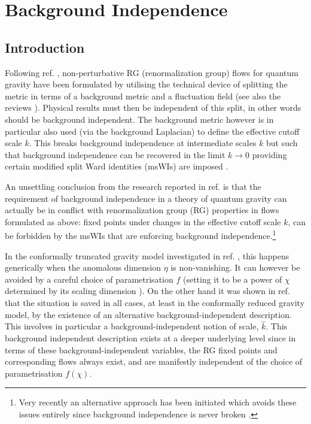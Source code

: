 \documentclass[11pt]{book} %
\begin{document}

\chapter{Background Independence}


\section{Introduction}
\label{sec:introduction}

Following ref. \cite{Reuter:1996cp},
non-perturbative RG (renormalization group) flows for quantum gravity have been formulated
by utilising the technical device of splitting the metric in terms of a background metric
and a fluctuation field (see also the reviews
\cite{Reuter:2012id, Percacci:2011fr, Niedermaier:2006wt, Nagy:2012ef, Litim:2011cp}).
Physical results must then be independent of this split, in other words should be background independent.
The background metric however is in particular also used (via the background Laplacian)
to define the effective cutoff scale $k$.
This breaks background independence at intermediate scales $k$ but such that background
independence can be recovered in the limit $k\to0$ providing certain modified split Ward
identities (msWIs) are imposed
\cite{Pawlowski:2005xe, Litim:2002hj, Bridle:2013sra, Reuter:1997gx, Litim:1998nf, Litim:2002ce,
Manrique:2009uh, Manrique:2010mq, Manrique:2010am, Dietz:2015owa, Safari:2015dva}.



An unsettling conclusion from the research reported in ref. \cite{Dietz:2015owa} is that the requirement of background independence in a theory of quantum gravity can actually be in conflict with renormalization group (RG) properties in flows formulated as above: fixed points under changes in the effective cutoff scale $k$, can be forbidden by the msWIs  that are enforcing background independence.\footnote{Very recently an alternative approach has been initiated which avoids these issues entirely since background independence is never broken \cite{Morris:2016nda}.}

In the conformally truncated gravity model investigated in ref.  \cite{Dietz:2015owa}, this happens generically when the anomalous dimension $\eta$ is non-vanishing.
It can however be avoided by a careful choice of parametrisation $f$ (setting it to be a power of $\chi$ determined by its scaling dimension \cite{Dietz:2015owa}).
On the other hand it was shown in ref. \cite{Dietz:2015owa} that the situation is saved in all cases, at least in the conformally reduced gravity model, by the existence of an alternative background-independent description. This involves in particular a background-independent notion of scale, $\hat{k}$. This background independent description exists at a deeper underlying level since in terms of these background-independent variables, the RG fixed points and corresponding flows always exist, and are manifestly independent of the choice of parametrisation $f(\chi)$.
\end{document}
